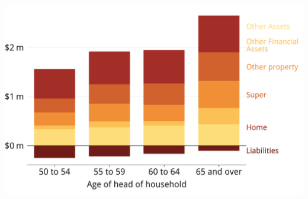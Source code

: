 \documentclass[tikz]{standalone}\usepackage[]{graphicx}\usepackage[]{color}
\newenvironment{knitrout}{}{} %
\begin{document}
\begin{knitrout}
\color{fgcolor}
\includegraphics[width=11.000in,height=7.00in]{./Super-tax-targeting/b5-super-atlas/Figure3-2-1} 

\end{knitrout}
\end{document}
